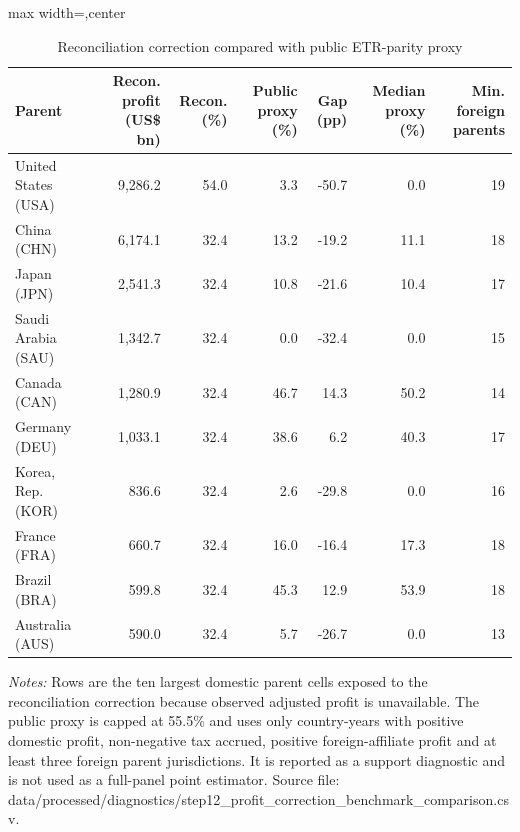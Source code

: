 \begin{table}[H]
\centering
\scriptsize
\caption{Reconciliation correction compared with public ETR-parity proxy}
\label{tab:app_profit_correction_benchmark_comparison}
\begin{adjustbox}{max width=\textwidth,center}
\begin{tabular}{@{}lrrrrrr@{}}
\toprule
Parent & Recon. profit (US\$ bn) & Recon. (\%) & Public proxy (\%) & Gap (pp) & Median proxy (\%) & Min. foreign parents \\
\midrule
United States (USA) & 9,286.2 & 54.0 &  3.3 & -50.7 &  0.0 & 19 \\
China (CHN) & 6,174.1 & 32.4 & 13.2 & -19.2 & 11.1 & 18 \\
Japan (JPN) & 2,541.3 & 32.4 & 10.8 & -21.6 & 10.4 & 17 \\
Saudi Arabia (SAU) & 1,342.7 & 32.4 &  0.0 & -32.4 &  0.0 & 15 \\
Canada (CAN) & 1,280.9 & 32.4 & 46.7 &  14.3 & 50.2 & 14 \\
Germany (DEU) & 1,033.1 & 32.4 & 38.6 &   6.2 & 40.3 & 17 \\
Korea, Rep. (KOR) &   836.6 & 32.4 &  2.6 & -29.8 &  0.0 & 16 \\
France (FRA) &   660.7 & 32.4 & 16.0 & -16.4 & 17.3 & 18 \\
Brazil (BRA) &   599.8 & 32.4 & 45.3 &  12.9 & 53.9 & 18 \\
Australia (AUS) &   590.0 & 32.4 &  5.7 & -26.7 &  0.0 & 13 \\
\bottomrule
\end{tabular}
\end{adjustbox}

\vspace{0.5em}
\begin{minipage}{0.96\textwidth}
\footnotesize\raggedright \textit{Notes:} Rows are the ten largest domestic parent cells exposed to the reconciliation correction because observed adjusted profit is unavailable. The public proxy is capped at 55.5\% and uses only country-years with positive domestic profit, non-negative tax accrued, positive foreign-affiliate profit and at least three foreign parent jurisdictions. It is reported as a support diagnostic and is not used as a full-panel point estimator. Source file: data/processed/diagnostics/step12\_profit\_correction\_benchmark\_comparison.csv.
\end{minipage}
\end{table}

